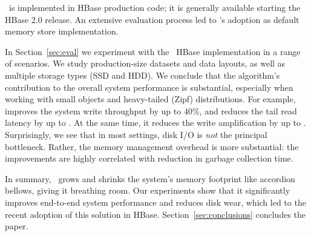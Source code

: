 \sys\ is implemented in HBase production code; it is generally available starting the HBase 2.0 release. 
An extensive evaluation process led to \sys's adoption as default memory store implementation. 

In Section~\ref{sec:eval} we experiment with the \sys\ HBase implementation in a range of scenarios.
We study production-size datasets and data layouts, as well as multiple storage types (SSD and HDD). 
We conclude that the algorithm's contribution to the overall system performance is substantial, 
especially when working with small objects and heavy-tailed (Zipf) distributions. For example, \sys\/ 
improves the system write throughput by up to $40\%$, and reduces the tail read latency by up to 
. At the same time, it reduces the write amplification by up to . Surprisingly, we see 
that in most settings, disk I/O is \emph{not} the principal bottleneck. Rather, the memory management 
overhead is more substantial: the improvements are highly correlated with  reduction in garbage collection time. 

In summary, \sys\ grows and shrinks the system's memory footprint like accordion bellows, giving it breathing 
room. Our experiments show that it significantly improves end-to-end system performance and reduces disk wear, 
which led to the recent adoption of this solution in HBase. Section~\ref{sec:conclusions} concludes the paper.

